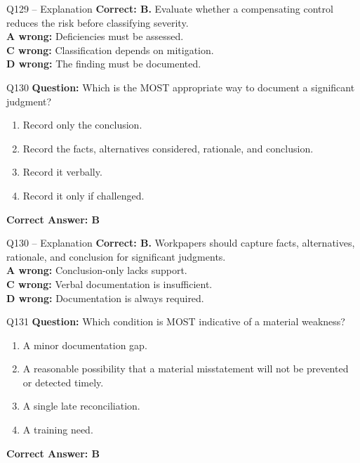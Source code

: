 \documentclass[aspectratio=169,10pt]{beamer}
\begin{document}
	\begin{frame}[t]{Q129 -- Explanation}
		\small
		\textbf{Correct: B.} Evaluate whether a compensating control reduces the risk before classifying severity. \\[4pt]
		\textbf{A wrong:} Deficiencies must be assessed. \\[2pt]
		\textbf{C wrong:} Classification depends on mitigation. \\[2pt]
		\textbf{D wrong:} The finding must be documented.
	\end{frame}
	
	\begin{frame}[t]{Q130}
		\small
		\textbf{Question:} Which is the MOST appropriate way to document a significant judgment?
		\begin{enumerate}[label=\Alph*.,itemsep=1pt,topsep=2pt]
			\item Record only the conclusion.
			\item Record the facts, alternatives considered, rationale, and conclusion.
			\item Record it verbally.
			\item Record it only if challenged.
		\end{enumerate}
		\vspace{4pt}
		\textbf{Correct Answer: B}
	\end{frame}
	
	\begin{frame}[t]{Q130 -- Explanation}
		\small
		\textbf{Correct: B.} Workpapers should capture facts, alternatives, rationale, and conclusion for significant judgments. \\[4pt]
		\textbf{A wrong:} Conclusion-only lacks support. \\[2pt]
		\textbf{C wrong:} Verbal documentation is insufficient. \\[2pt]
		\textbf{D wrong:} Documentation is always required.
	\end{frame}
	
	\begin{frame}[t]{Q131}
		\small
		\textbf{Question:} Which condition is MOST indicative of a material weakness?
		\begin{enumerate}[label=\Alph*.,itemsep=1pt,topsep=2pt]
			\item A minor documentation gap.
			\item A reasonable possibility that a material misstatement will not be prevented or detected timely.
			\item A single late reconciliation.
			\item A training need.
		\end{enumerate}
		\vspace{4pt}
		\textbf{Correct Answer: B}
	\end{frame}
	
\end{document}
